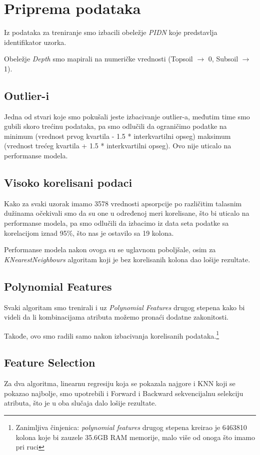 \documentclass[12pt]{article}
\begin{document}
\section{Priprema podataka}
Iz podataka za treniranje smo izbacili obeležje \textit{PIDN} koje predstavlja identifikator uzorka.

Obeležje \textit{Depth} smo mapirali na numeričke vrednosti (Topsoil $\rightarrow$ 0, Subsoil $\rightarrow$ 1).

\subsection{Outlier-i}
Jedna od stvari koje smo pokušali jeste izbacivanje outlier-a, međutim time smo gubili skoro trećinu podataka, pa smo odlučili da ograničimo podatke na minimum (vrednost prvog kvartila - 1.5 * interkvartilni opseg) maksimum (vrednost trećeg kvartila + 1.5 * interkvartilni opseg). Ovo nije uticalo na performanse modela.

\subsection{Visoko korelisani podaci}
Kako za svaki uzorak imamo 3578 vrednosti apsorpcije po različitim talasnim dužinama očekivali smo da su one u određenoj meri korelisane, što bi uticalo na performanse modela, pa smo odlučili da izbacimo iz data seta podatke sa korelacijom iznad 95\%, što nas je ostavilo sa 19 kolona.

Performanse modela nakon ovoga su se uglavnom poboljšale, osim za \textit{KNearestNeighbours} algoritam koji je bez korelisanih kolona dao lošije rezultate.

\subsection{Polynomial Features}
Svaki algoritam smo trenirali i uz \textit{Polynomial Features} drugog stepena kako bi videli da li kombinacijama atributa možemo pronaći dodatne zakonitosti.

Takođe, ovo smo radili samo nakon izbacivanja korelisanih podataka.\footnote{Zanimljiva činjenica: \textit{polynomial features} drugog stepena kreirao je 6463810 kolona koje bi zauzele 35.6GB RAM memorije, malo više od onoga što imamo pri ruci}

\subsection{Feature Selection}
Za dva algoritma, linearnu regresiju koja se pokazala najgore i KNN koji se pokazao najbolje, smo upotrebili i Forward i Backward sekvencijalnu selekciju atributa, što je u oba slučaja dalo lošije rezultate.
\end{document}
